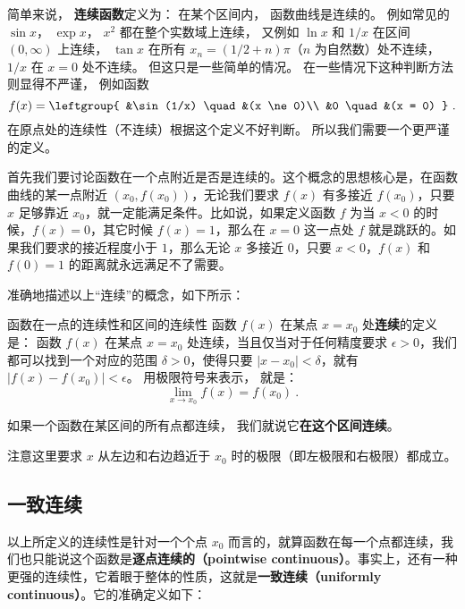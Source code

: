

简单来说， \textbf{连续函数}定义为： 在某个区间内， 函数曲线是连续的。 例如常见的 $\sin x$， $\exp x$， $x^2$ 都在整个实数域上连续， 又例如 $\ln x$ 和 $1/x$ 在区间 $(0, \infty)$ 上连续， $\tan x$ 在所有 $x_n = (1/2 + n)\pi$（$n$ 为自然数）处不连续， $1/x$ 在 $x = 0$ 处不连续。 但这只是一些简单的情况。 在一些情况下这种判断方法则显得不严谨， 例如函数
\begin{equation}
f(x) = \leftgroup{
    &\sin(1/x) \quad &(x \ne 0)\\
    &0  \quad &(x = 0)
}~.
\end{equation}
在原点处的连续性（不连续）根据这个定义不好判断。 所以我们需要一个更严谨的定义。

首先我们要讨论函数在一个点附近是否是连续的。这个概念的思想核心是，在函数曲线的某一点附近 $(x_0, f(x_0))$，无论我们要求 $f(x)$ 有多接近 $f(x_0)$，只要 $x$ 足够靠近 $x_0$，就一定能满足条件。比如说，如果定义函数 $f$ 为当 $x<0$ 的时候，$f(x)=0$，其它时候 $f(x)=1$，那么在 $x=0$ 这一点处 $f$ 就是跳跃的。如果我们要求的接近程度小于 $1$，那么无论 $x$ 多接近 $0$，只要 $x<0$，$f(x)$ 和 $f(0)=1$ 的距离就永远满足不了需要。

准确地描述以上“连续”的概念，如下所示：

\begin{definition}{函数在一点的连续性和区间的连续性}
函数 $f(x)$ 在某点 $x = x_0$ 处\textbf{连续}的定义是： 函数 $f(x)$ 在某点 $x=x_0$ 处连续，当且仅当对于任何精度要求 $\epsilon>0$，我们都可以找到一个对应的范围 $\delta>0$，使得只要 $|x-x_0|<\delta$，就有 $|f(x)-f(x_0)|<\epsilon$。 用极限符号来表示， 就是：
\begin{equation}
\lim_{x \to x_0} f(x) = f(x_0)~.
\end{equation}

如果一个函数在某区间的所有点都连续， 我们就说它\textbf{在这个区间连续}。
\end{definition}

注意这里要求 $x$ 从左边和右边趋近于 $x_0$ 时的极限（即左极限和右极限）都成立。 %

\subsection{一致连续}

以上所定义的连续性是针对一个个点 $x_0$ 而言的，就算函数在每一个点都连续，我们也只能说这个函数是\textbf{逐点连续的（pointwise continuous）}。事实上，还有一种更强的连续性，它着眼于整体的性质，这就是\textbf{一致连续（uniformly continuous）}。它的准确定义如下：

